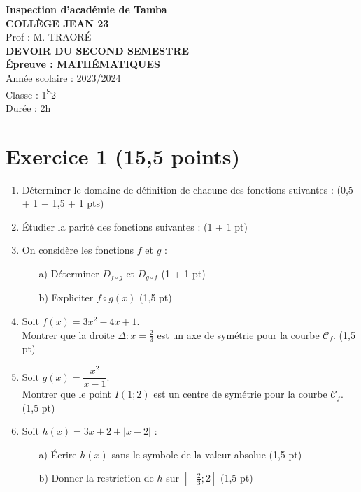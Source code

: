 \documentclass[a4paper,12pt]{article}
\begin{document}
\begin{center}
    \textbf{Inspection d'académie de Tamba} \\
    \textbf{COLLÈGE JEAN 23} \\
    \vspace{0.4cm}
    Prof : M. TRAORÉ \\
    \textbf{DEVOIR DU SECOND SEMESTRE} \\
    \textbf{Épreuve : MATHÉMATIQUES} \\
    Année scolaire : 2023/2024 \\
    Classe : 1\textsuperscript{S}2 \\
    Durée : 2h
\end{center}

\vspace{0.5cm}

\section*{Exercice 1 \hfill (15,5 points)}

\begin{enumerate}
    \item Déterminer le domaine de définition de chacune des fonctions suivantes : \hfill (0,5 + 1 + 1,5 + 1 pts)

    \item Étudier la parité des fonctions suivantes : \hfill (1 + 1 pt)

    \item On considère les fonctions \( f \) et \( g \) :
    \begin{itemize}
        \item[a)] Déterminer \( D_{f \circ g} \) et \( D_{g \circ f} \) \hfill (1 + 1 pt)
        \item[b)] Expliciter \( f \circ g(x) \) \hfill (1,5 pt)
    \end{itemize}

    \item Soit \( f(x) = 3x^2 - 4x + 1 \). \\
    Montrer que la droite \( \Delta : x = \frac{2}{3} \) est un axe de symétrie pour la courbe \( \mathcal{C}_f \). \hfill (1,5 pt)

    \item Soit \( g(x) = \dfrac{x^2}{x - 1} \). \\
    Montrer que le point \( I(1; 2) \) est un centre de symétrie pour la courbe \( \mathcal{C}_f \). \hfill (1,5 pt)

    \item Soit \( h(x) = 3x + 2 + |x - 2| \) :
    \begin{itemize}
        \item[a)] Écrire \( h(x) \) sans le symbole de la valeur absolue \hfill (1,5 pt)
        \item[b)] Donner la restriction de \( h \) sur \( [-\frac{2}{3} ; 2] \) \hfill (1,5 pt)
    \end{itemize}
\end{enumerate}
\end{document}
